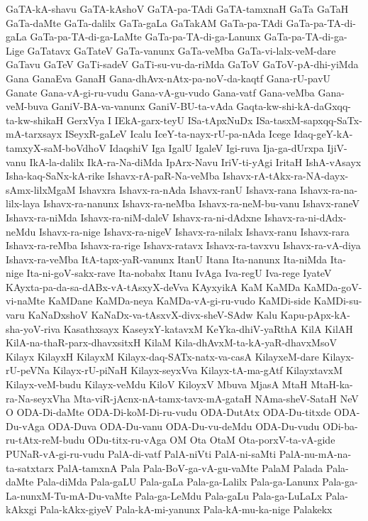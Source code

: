 {GaTA-kA-shavu
GaTA-kAshoV
GaTA-pa-TAdi
GaTA-tamxnaH
GaTa
GaTaH
GaTa-daMte
GaTa-dalilx
GaTa-gaLa
GaTakAM
GaTa-pa-TAdi
GaTa-pa-TA-di-gaLa
GaTa-pa-TA-di-ga-LaMte
GaTa-pa-TA-di-ga-Lanunx
GaTa-pa-TA-di-ga-Lige
GaTatavx
GaTateV
GaTa-vanunx
GaTa-veMba
GaTa-vi-lalx-veM-dare
GaTavu
GaTeV
GaTi-sadeV
GaTi-su-vu-da-riMda
GaToV
GaToV-pA-dhi-yiMda
Gana
GanaEva
GanaH
Gana-dhAvx-nAtx-pa-noV-da-kaqtf
Gana-rU-pavU
Ganate
Gana-vA-gi-ru-vudu
Gana-vA-gu-vudo
Gana-vatf
Gana-veMba
Gana-veM-buva
GaniV-BA-va-vanunx
GaniV-BU-ta-vAda
Gaqta-kw-shi-kA-daGxqq-ta-kw-shikaH
GerxVya
I
IEkA-garx-teyU
ISa-tApxNuDx
ISa-tasxM-sapxqq-SaTx-mA-tarxsayx
ISeyxR-gaLeV
Icalu
IceY-ta-nayx-rU-pa-nAda
Icege
Idaq-geY-kA-tamxyX-saM-boVdhoV
IdaqshiV
Iga
IgalU
IgaleV
Igi-ruva
Ija-ga-dUrxpa
IjiV-vanu
IkA-la-dalilx
IkA-ra-Na-diMda
IpArx-Navu
IriV-ti-yAgi
IritaH
IshA-vAsayx
Isha-kaq-SaNx-kA-rike
Ishavx-rA-paR-Na-veMba
Ishavx-rA-tAkx-ra-NA-dayx-sAmx-lilxMgaM
Ishavxra
Ishavx-ra-nAda
Ishavx-ranU
Ishavx-rana
Ishavx-ra-na-lilx-laya
Ishavx-ra-nanunx
Ishavx-ra-neMba
Ishavx-ra-neM-bu-vanu
Ishavx-raneV
Ishavx-ra-niMda
Ishavx-ra-niM-daleV
Ishavx-ra-ni-dAdxne
Ishavx-ra-ni-dAdx-neMdu
Ishavx-ra-nige
Ishavx-ra-nigeV
Ishavx-ra-nilalx
Ishavx-ranu
Ishavx-rara
Ishavx-ra-reMba
Ishavx-ra-rige
Ishavx-ratavx
Ishavx-ra-tavxvu
Ishavx-ra-vA-diya
Ishavx-ra-veMba
ItA-tapx-yaR-vanunx
ItanU
Itana
Ita-nanunx
Ita-niMda
Ita-nige
Ita-ni-goV-sakx-rave
Ita-nobabx
Itanu
IvAga
Iva-regU
Iva-rege
IyateV
KAyxta-pa-da-sa-dABx-vA-tAsxyX-deVva
KAyxyikA
KaM
KaMDa
KaMDa-goV-vi-naMte
KaMDane
KaMDa-neya
KaMDa-vA-gi-ru-vudo
KaMDi-side
KaMDi-su-varu
KaNaDxshoV
KaNaDx-va-tAsxvX-divx-sheV-SAdw
Kalu
Kapu-pApx-kA-sha-yoV-riva
Kasathxsayx
KaseyxY-katavxM
KeYka-dhiV-yaRthA
KilA
KilAH
KilA-na-thaR-parx-dhavxsitxH
KilaM
Kila-dhAvxM-ta-kA-yaR-dhavxMsoV
Kilayx
KilayxH
KilayxM
Kilayx-daq-SATx-natx-va-casA
KilayxeM-dare
Kilayx-rU-peVNa
Kilayx-rU-piNaH
Kilayx-seyxVva
Kilayx-tA-ma-gAtf
KilayxtavxM
Kilayx-veM-budu
Kilayx-veMdu
KiloV
KiloyxV
Mbuva
MjasA
MtaH
MtaH-ka-ra-Na-seyxVha
Mta-viR-jAcnx-nA-tamx-tavx-mA-gataH
NAma-sheV-SataH
NeV
O
ODA-Di-daMte
ODA-Di-koM-Di-ru-vudu
ODA-DutAtx
ODA-Du-titxde
ODA-Du-vAga
ODA-Duva
ODA-Du-vanu
ODA-Du-vu-deMdu
ODA-Du-vudu
ODi-ba-ru-tAtx-reM-budu
ODu-titx-ru-vAga
OM
Ota
OtaM
Ota-porxV-ta-vA-gide
PUNaR-vA-gi-ru-vudu
PalA-di-vatf
PalA-niVti
PalA-ni-saMti
PalA-nu-mA-na-ta-satxtarx
PalA-tamxnA
Pala
Pala-BoV-ga-vA-gu-vaMte
PalaM
Palada
Pala-daMte
Pala-diMda
Pala-gaLU
Pala-gaLa
Pala-ga-Lalilx
Pala-ga-Lanunx
Pala-ga-La-nunxM-Tu-mA-Du-vaMte
Pala-ga-LeMdu
Pala-gaLu
Pala-ga-LuLaLx
Pala-kAkxgi
Pala-kAkx-giyeV
Pala-kA-mi-yanunx
Pala-kA-mu-ka-nige
Palakekx
}
